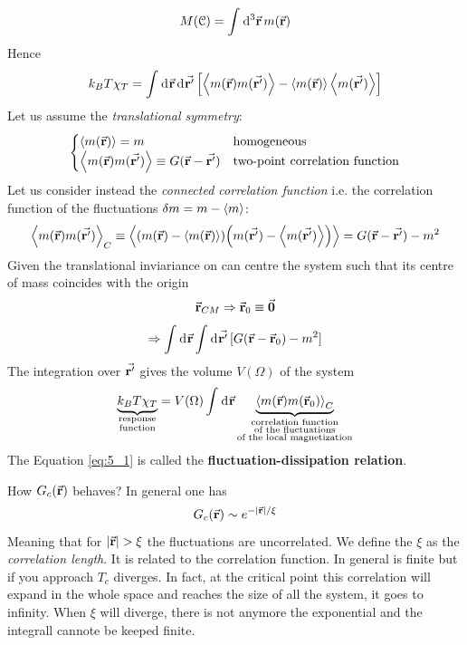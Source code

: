 \documentclass[../main/main.tex]{subfiles}
\begin{document}
\begin{equation}
  M (\mathcal{C}) = \int_{}^{} \dd[3]{\va{r}}   m (\va{r})
\end{equation}
Hence
\begin{equation}
  k_B T \chi _T = \int_{}^{} \dd[]{\va{r}}  \dd[]{\va{r'}}   \qty[\expval{m (\va{r}) m (\va{r'})} - \expval{m(\va{r}) } \expval{m (\va{r'})}  ]
\end{equation}
Let us assume the \emph{translational symmetry}:
\begin{equation}
  \begin{cases}
   \expval{ m (\va{r})} = m   & \text{homogeneous} \\
   \expval{ m (\va{r}) m (\va{r'})} \equiv G (\va{r}-\va{r'}) & \text{two-point correlation function}
  \end{cases}
\end{equation}
Let us consider instead the \emph{connected correlation function} i.e. the correlation function of the fluctuations \( \delta m = m - \expval{m}  \):
\begin{equation}
  \expval{ m (\va{r}) m (\va{r'})}_C \equiv \expval{ \qty(m(\va{r}) - \expval{m (\va{r})} )  \qty(m(\va{r'}) - \expval{m(\va{r'})} ) } = G (\va{r}-\va{r'})  -m^2
\end{equation}
Given the translational inviariance on can centre the system such that its centre of mass coincides with the origin
\begin{equation}
  \va{r}_{CM} \Rightarrow \va{r}_0 \equiv \va{0}
\end{equation}
\begin{equation}
  \Rightarrow \int_{}^{} \dd[]{\va{r}} \int_{}^{} \dd[]{\va{r'}} [ G (\va{r} - \va{r}_0) -m^2]
\end{equation}
The integration over \( \va{r'} \) gives the volume \( V (\Omega ) \) of the system
\begin{equation}
  \underbrace{ k_B T \chi_T }_{\substack{ \text{response} \\  \text{function} } }= V (\Omega ) \int_{}^{} \dd[]{\va{r}} \underbrace{\expval{m(\va{r})m(\va{r}_0)}_C}_{ \substack{ \text{correlation function} \\  \text{of the fluctuations}  \\ \text{of the local magnetization}} }
  \label{eq:5_1}
\end{equation}
The Equation \eqref{eq:5_1} is called the \textbf{fluctuation-dissipation relation}.

How \( G_c (\va{r}) \) behaves? In general one has
\begin{equation}
  G_c (\va{r}) \sim e^{- \abs{\va{r}}/\xi  }
\end{equation}
Meaning that for \( \abs{\va{r}} > \xi   \) the fluctuations are uncorrelated. We define the \( \xi  \) as the \emph{correlation length}.
It is related to the correlation function. In general is finite but if you approach \( T_c \)  diverges. In fact, at the critical point this correlation will expand in the whole space and reaches the size of all the system, it goes to infinity. When \( \xi  \)  will diverge, there is not anymore the exponential and the integrall cannote be keeped finite.
\end{document}
